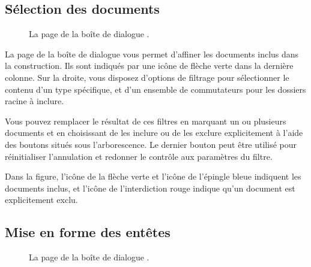 \documentclass[a4paper,11pt,french]{sphinxmanual}
\begin{document}
\subsection{Sélection des documents}
\label{\detokenize{project_manuscript:document-selection}}
\begin{figure}[htbp]
\centering
\capstart

\noindent{}
\caption{La page  de la boîte de dialogue .}\label{\detokenize{project_manuscript:id3}}\end{figure}

\sphinxAtStartPar
La page  de la boîte de dialogue  vous permet d’affiner les documents inclus dans la construction. Ils sont indiqués par une icône de flèche verte dans la dernière colonne. Sur la droite, vous disposez d’options de filtrage pour sélectionner le contenu d’un type spécifique, et d’un ensemble de commutateurs pour les dossiers racine à inclure.

\sphinxAtStartPar
Vous pouvez remplacer le résultat de ces filtres en marquant un ou plusieurs documents et en choisissant de les inclure ou de les exclure explicitement à l’aide des boutons situés sous l’arborescence. Le dernier bouton peut être utilisé pour réinitialiser l’annulation et redonner le contrôle aux paramètres du filtre.

\sphinxAtStartPar
Dans la figure, l’icône de la flèche verte et l’icône de l’épingle bleue indiquent les documents inclus, et l’icône de l’interdiction rouge indique qu’un document est explicitement exclu.


\subsection{Mise en forme des en\sphinxhyphen{}têtes}
\label{\detokenize{project_manuscript:formatting-headings}}\label{\detokenize{project_manuscript:a-manuscript-settings-head}}
\begin{figure}[htbp]
\centering
\capstart

\noindent{}
\caption{La page  de la boîte de dialogue .}\label{\detokenize{project_manuscript:id4}}\end{figure}
\end{document}
